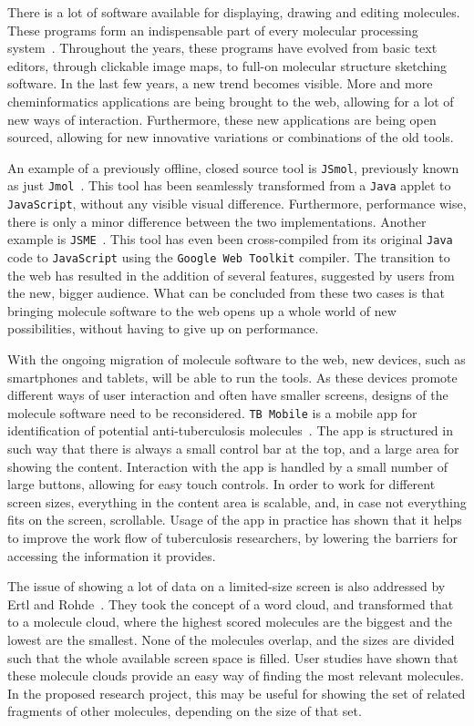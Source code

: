 There is a lot of software available for displaying, drawing and editing molecules. These programs form an indispensable part of every molecular processing system~\cite{ertl2010molecular}. Throughout the years, these programs have evolved from basic text editors, through clickable image maps, to full-on molecular structure sketching software. In the last few years, a new trend becomes visible. More and more cheminformatics applications are being brought to the web, allowing for a lot of new ways of interaction. Furthermore, these new applications are being open sourced, allowing for new innovative variations or combinations of the old tools.

An example of a previously offline, closed source tool is \verb|JSmol|, previously known as just \verb|Jmol|~\cite{hanson2013jsmol}. This tool has been seamlessly transformed from a \verb|Java| applet to \verb|JavaScript|, without any visible visual difference. Furthermore, performance wise, there is only a minor difference between the two implementations. Another example is \verb|JSME|~\cite{bienfait2013jsme}. This tool has even been cross-compiled from its original \verb|Java| code to \verb|JavaScript| using the \verb|Google Web Toolkit| compiler. The transition to the web has resulted in the addition of several features, suggested by users from the new, bigger audience. What can be concluded from these two cases is that bringing molecule software to the web opens up a whole world of new possibilities, without having to give up on performance.

With the ongoing migration of molecule software to the web, new devices, such as smartphones and tablets, will be able to run the tools. As these devices promote different ways of user interaction and often have smaller screens, designs of the molecule software need to be reconsidered. \verb|TB Mobile| is a mobile app for identification of potential anti-tuberculosis molecules~\cite{ekins2013tb}. The app is structured in such way that there is always a small control bar at the top, and a large area for showing the content. Interaction with the app is handled by a small number of large buttons, allowing for easy touch controls. In order to work for different screen sizes, everything in the content area is scalable, and, in case not everything fits on the screen, scrollable. Usage of the app in practice has shown that it helps to improve the work flow of tuberculosis researchers, by lowering the barriers for accessing the information it provides.

The issue of showing a lot of data on a limited-size screen is also addressed by Ertl and Rohde~\cite{ertl2012molecule}. They took the concept of a word cloud, and transformed that to a molecule cloud, where the highest scored molecules are the biggest and the lowest are the smallest. None of the molecules overlap, and the sizes are divided such that the whole available screen space is filled. User studies have shown that these molecule clouds provide an easy way of finding the most relevant molecules. In the proposed research project, this may be useful for showing the set of related fragments of other molecules, depending on the size of that set.


